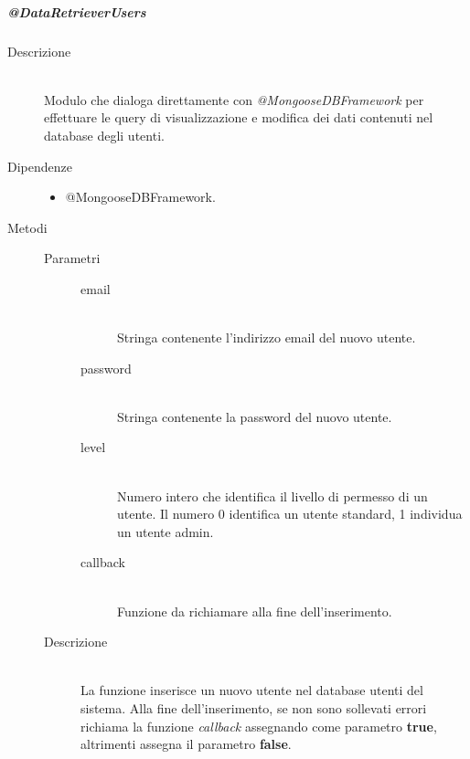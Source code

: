 \subparagraph{@DataRetrieverUsers}
\begin{description}
 \item[Descrizione] \hfill \\
 Modulo che dialoga direttamente con \textit{@MongooseDBFramework} per effettuare le query di visualizzazione e modifica dei dati contenuti nel database degli utenti.
 \item[Dipendenze] \hfill 
 	\begin{itemize}
 		\item @MongooseDBFramework.
 	\end{itemize}
 \item[Metodi]
 	\begin{mldescription}
 		 \hfill
 			\begin{description}
 				\item[Parametri] \hfill
 					\begin{description}
 						\item[email] \hfill \\
 							Stringa contenente l'indirizzo email del nuovo utente.
 						\item[password] \hfill \\
 							Stringa contenente la password del nuovo utente.
 						\item[level] \hfill \\
 							Numero intero che identifica il livello di permesso di un utente. Il numero 0 identifica un utente standard, 1 individua un utente admin. 
 						\item[callback] \hfill \\
 							Funzione da richiamare alla fine dell'inserimento.
 					\end{description}
 				\item[Descrizione] \hfill \\
 				La funzione inserisce un nuovo utente nel database utenti del sistema. Alla fine 	dell'inserimento, se non sono sollevati errori richiama la funzione \textit{callback} assegnando come parametro \textbf{true}, altrimenti assegna il parametro \textbf{false}.
 			\end{description}
 			

\end{mldescription}
\end{description}
